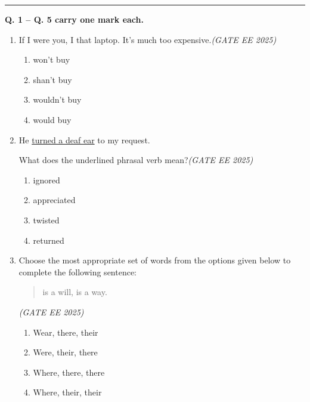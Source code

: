 \documentclass[11pt,a4paper]{article}
\begin{document}
\rule{\textwidth}{0.3pt}

\textbf{Q. 1 -- Q. 5 carry one mark each.}

\begin{enumerate}[leftmargin=0pt,label=\textbf{Q.\arabic*}]
\item If I were you, I \underline{\hspace{2.5cm}} that laptop. It’s much too expensive.\hfill \textit{(GATE EE 2025)}

\begin{multicols}{2}
\begin{enumerate}[label=(\Alph*)]
\item won’t buy
\item shan’t buy
\item wouldn’t buy
\item would buy
\end{enumerate}
\end{multicols}

\vspace{1em}

\item He \underline{turned a deaf ear} to my request. 

What does the underlined phrasal verb mean?\hfill \textit{(GATE EE 2025)}

\begin{multicols}{2}
\begin{enumerate}[label=(\Alph*)]
\item ignored
\item appreciated
\item twisted
\item returned
\end{enumerate}
\end{multicols}

\vspace{1em}

\item Choose the most appropriate set of words from the options given below to complete the following sentence:

\begin{quote}
\underline{\hspace{3cm}} \quad \underline{\hspace{3cm}} \quad is a will, \quad \underline{\hspace{3cm}} \quad is a way.
\end{quote}
\hfill \textit{(GATE EE 2025)}
\begin{multicols}{2}
\begin{enumerate}[label=(\Alph*)]
\item Wear, there, their
\item Were, their, there
\item Where, there, there
\item Where, their, their
\end{enumerate}
\end{multicols}


\end{enumerate}
\end{document}
